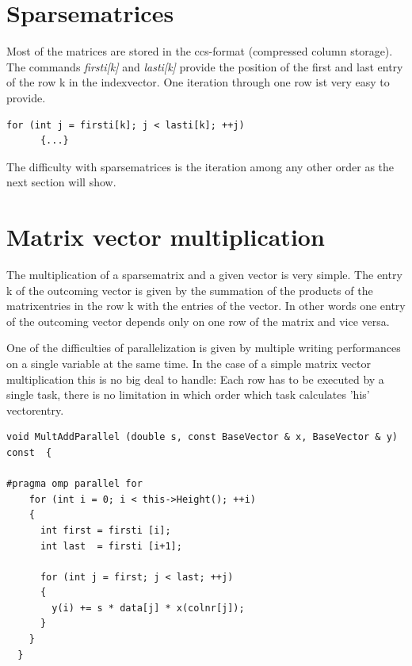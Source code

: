 \documentclass[a4paper,11pt]{scrartcl}
\begin{document}
\section{Sparsematrices}

Most of the matrices are stored in the ccs-format (compressed column storage).
 The commands {\em firsti[k]} and {\em lasti[k]} provide the position of the
 first and last entry of the row k in the indexvector. One
 iteration through one row ist very easy to provide.

\begin{lstlisting}
for (int j = firsti[k]; j < lasti[k]; ++j)
      {...}

\end{lstlisting}

The difficulty with sparsematrices is the iteration among any other order as
the next section will show.

\section{Matrix vector multiplication}

The multiplication of a sparsematrix and a given vector is very simple.
The entry k of the outcoming vector is given by the summation of the products
of the matrixentries in the row k with the entries of the vector. In other
words one entry of the outcoming vector depends only on one row of the matrix
and vice versa.

One of the difficulties of parallelization is given by multiple writing
performances on a single variable at the same time. In the case of a simple
 matrix vector multiplication this is no big deal to handle: Each row has to be
executed by a single task, there is no limitation in which order which task
 calculates 'his' vectorentry.

\begin{lstlisting}
void MultAddParallel (double s, const BaseVector & x, BaseVector & y) const  {

#pragma omp parallel for
    for (int i = 0; i < this->Height(); ++i)
    {
      int first = firsti [i];
      int last  = firsti [i+1];

      for (int j = first; j < last; ++j)
      {
        y(i) += s * data[j] * x(colnr[j]);
      }
    }
  }

\end{lstlisting}
\end{document}

